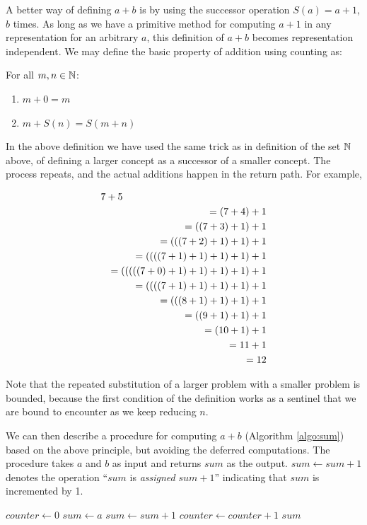 A better way of defining $a+b$ is by using the successor operation $S(a) = a+1$, $b$ times.  As long as we have a primitive method for computing $a+1$ in any representation for an arbitrary $a$, this definition of $a+b$ becomes representation independent.  We may  define the basic property of addition  using counting as:

For all $m,n \in \mathbb{N}$:
\begin{enumerate}
\item $m + 0 = m$
\item $m + S(n) = S(m+n)$
\end{enumerate}

In the above definition we have used the same trick as in definition of the set $\mathbb{N}$ above, of defining a larger concept as a successor of a smaller concept.  The process repeats, and the actual additions happen in the return path. For example,

\begin{eqnarray*}
\lefteqn{7+5}\\
 & & = (7 + 4) + 1\\
 & & = ((7 + 3) + 1) + 1 \\
 & & = (((7 + 2) + 1)  + 1) + 1 \\
 & & =  ((((7 + 1) + 1)  + 1) + 1) + 1\\
 & & =  (((((7 + 0) + 1) + 1) + 1)  + 1)  + 1 \\
 & & =  ((((7 + 1)  + 1) + 1) + 1) + 1\\
 & & =  (((8 + 1) + 1) + 1) + 1\\
 & & =   ((9 + 1)  + 1) + 1\\
 & & =   (10 + 1) + 1 \\
 & & =  11 + 1 \\
 & & = 12
\end{eqnarray*}

Note that the repeated substitution of a larger problem with a smaller problem is bounded, because the first condition of the definition works as a sentinel that we are bound to encounter as we keep reducing $n$.

We  can then describe a procedure for computing $a+b$ (Algorithm \ref{algo:sum}) based on the above principle, but avoiding the deferred computations. The procedure takes $a$ and $b$ as input and returns $sum$ as the output. $sum \leftarrow sum+1$ denotes the operation ``$sum$ is {\em assigned} $sum+1$'' indicating that $sum$ is incremented by 1.

\begin{algorithm}

\begin{algorithmic}[1]
\State $counter \leftarrow 0$
\State $sum \leftarrow a$  
	\State $sum \leftarrow sum + 1$
	\State $counter \leftarrow counter + 1$
\EndWhile
\Return $sum$
\EndProcedure
\end{algorithmic}
\caption{An algorithm for $a+b$ by  $+1$ $b$-times. }
\label{algo:sum}
\end{algorithm}

